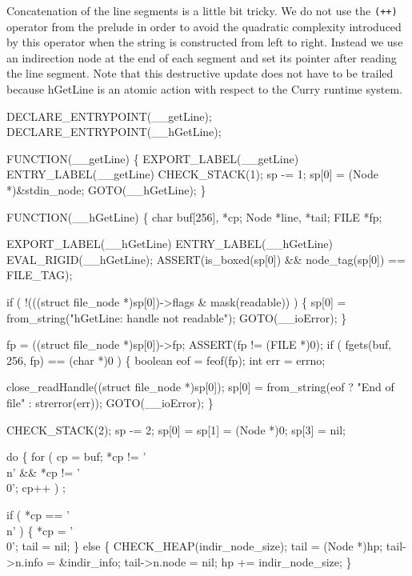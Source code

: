 Concatenation of the line segments is a little bit tricky. We do not
use the \texttt{(++)} operator from the prelude in order to avoid the
quadratic complexity introduced by this operator when the string is
constructed from left to right. Instead we use an indirection node at
the end of each segment and set its pointer after reading the line
segment. Note that this destructive update does not have to be trailed
because {\Tt{}hGetLine\nwendquote} is an atomic action with respect to the Curry
runtime system.

\nwenddocs{}\plusendmoddef\nwstartdeflinemarkup{}\nwenddeflinemarkup
DECLARE_ENTRYPOINT(__getLine);
DECLARE_ENTRYPOINT(__hGetLine);

FUNCTION(__getLine)
\{
    EXPORT_LABEL(__getLine)
 ENTRY_LABEL(__getLine)
    CHECK_STACK(1);
    sp   -= 1;
    sp[0] = (Node *)&stdin_node;
    GOTO(__hGetLine);
\}

FUNCTION(__hGetLine)
\{
    char buf[256], *cp;
    Node *line, *tail;
    FILE *fp;

    EXPORT_LABEL(__hGetLine)
 ENTRY_LABEL(__hGetLine)
    EVAL_RIGID(__hGetLine);
    ASSERT(is_boxed(sp[0]) && node_tag(sp[0]) == FILE_TAG);

    if ( !(((struct file_node *)sp[0])->flags & mask(readable)) )
    \{
        sp[0] = from_string("hGetLine: handle not readable");
        GOTO(__ioError);
    \}

    fp = ((struct file_node *)sp[0])->fp;
    ASSERT(fp != (FILE *)0);
    if ( fgets(buf, 256, fp) == (char *)0 )
    \{
        boolean eof = feof(fp);
        int     err = errno;

        close_readHandle((struct file_node *)sp[0]);
        sp[0] = from_string(eof ? "End of file" : strerror(err));
        GOTO(__ioError);
    \}

    CHECK_STACK(2);
    sp   -= 2;
    sp[0] = sp[1] = (Node *)0;
    sp[3] = nil;

    do
    \{
        for ( cp = buf; *cp != '\\n' && *cp != '\\0'; cp++ )
            ;

        if ( *cp == '\\n' )
        \{
            *cp  = '\\0';
            tail = nil;
        \}
        else
        \{
            CHECK_HEAP(indir_node_size);
            tail         = (Node *)hp;
            tail->n.info = &indir_info;
            tail->n.node = nil;
            hp          += indir_node_size;
        \}

